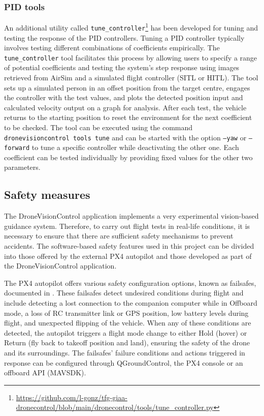 \subsubsection{PID tools}
An additional utility called \texttt{tune\_controller}\footnote{\url{https://github.com/l-gonz/tfg-giaa-dronecontrol/blob/main/dronecontrol/tools/tune_controller.py}} has been developed for tuning and testing the response of the PID controllers. Tuning a PID controller typically involves testing different combinations of coefficients empirically. The \texttt{tune\_controller} tool facilitates this process by allowing users to specify a range of potential coefficients and testing the system's step response using images retrieved from AirSim and a simulated flight controller (SITL or HITL). The tool sets up a simulated person in an offset position from the target centre, engages the controller with the test values, and plots the detected position input and calculated velocity output on a graph for analysis. After each test, the vehicle returns to the starting position to reset the environment for the next coefficient to be checked. The tool can be executed using the command \texttt{dronevisioncontrol tools tune} and can be started with the option \texttt{--yaw} or \texttt{--forward} to tune a specific controller while deactivating the other one. Each coefficient can be tested individually by providing fixed values for the other two parameters.


\subsection{Safety measures}
\label{subsec:safety}

The DroneVisionControl application implements a very experimental vision-based guidance system.
Therefore, to carry out flight tests in real-life conditions, it is necessary to ensure that there are sufficient safety mechanisms to prevent accidents. The software-based safety features used in this project can be divided into those offered by the external PX4 autopilot and those developed as part of the DroneVisionControl application.

The PX4 autopilot offers various safety configuration options, known as failsafes, documented in  \cite{px4-docs-safety}. These failsafes detect undesired conditions during flight and include detecting a lost connection to the companion computer while in Offboard mode, a loss of RC transmitter link or GPS position, low battery levels during flight, and unexpected flipping of the vehicle. When any of these conditions are detected, the autopilot triggers a flight mode change to either Hold (hover) or Return (fly back to takeoff position and land), ensuring the safety of the drone and its surroundings. The failsafes' failure conditions and actions triggered in response can be configured through QGroundControl, the PX4 console or an offboard API (MAVSDK).

